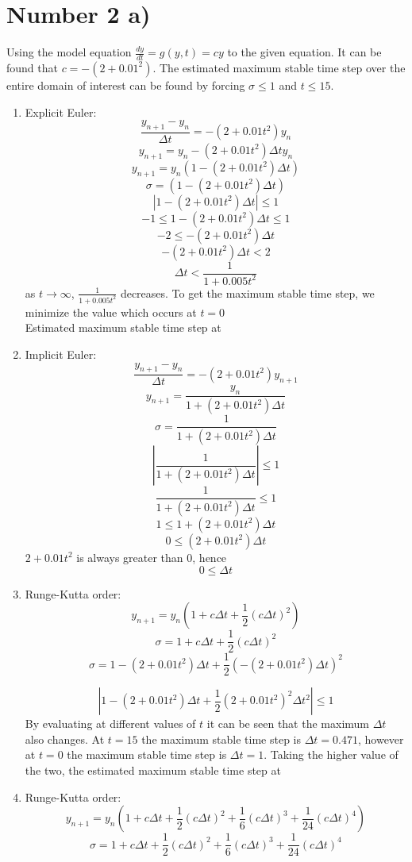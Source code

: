 \documentclass{article}
\begin{document}
	\section*{Number 2 a)}
		Using the model equation $\frac{dy}{dt} = g(y,t) = cy$ to the given equation. It can be found that $c=-(2+0.01^2)$. The estimated maximum stable time step over the entire domain of interest can be found by forcing $\sigma \leq 1$ and $t \leq 15 $.
		\begin{enumerate}[label=(\alph*)]
			\item Explicit Euler: 
			$$\frac{y_{n+1}-y_n}{\Delta t} = -(2+0.01t^2)y_n $$
			$$y_{n+1} = y_{n} -(2+0.01t^2)\Delta t y_{n}$$
			$$y_{n+1} = y_{n}(1 -(2+0.01t^2)\Delta t)$$
			$$\sigma = (1-(2+0.01t^2)\Delta t)$$
			$$|1-(2+0.01t^2)\Delta t| \leq 1$$
			$$-1 \leq 1-(2+0.01t^2)\Delta t \leq 1$$
			$$-2 \leq -(2+0.01t^2)\Delta t $$
			$$ -(2+0.01t^2)\Delta t < 2  $$
			$$ \Delta t < \frac{1}{1+0.005t^2}$$
			as $t \rightarrow \infty$, $\frac{1}{1+0.005t^2}$ decreases. To get the maximum stable time step, we minimize the value which occurs at $t = 0$ \\
			Estimated maximum stable time step at   			
			\item Implicit Euler:
			$$\frac{y_{n+1}-y_n}{\Delta t} = -(2+0.01t^2)y_{n+1} $$
			$$y_{n+1} = \frac{y_n}{1+(2+0.01t^2)\Delta t}$$
			$$\sigma = \frac{1}{1+(2+0.01t^2)\Delta t}$$
			$$| \frac{1}{1+(2+0.01t^2)\Delta t} |\leq 1 $$
			$$ \frac{1}{1+(2+0.01t^2)\Delta t} \leq 1 $$
			$$ 1 \leq 1 + (2+0.01t^2)\Delta t $$
			$$ 0 \leq (2+0.01t^2)\Delta t $$
			$2+0.01 t^2$ is always greater than 0, hence
			$$ 0 \leq \Delta t $$
			\item Runge-Kutta  order:
				$$y_{n+1} = y_{n} (1+c\Delta t + \frac{1}{2} (c\Delta t)^2) $$
				$$\sigma = 1+c\Delta t + \frac{1}{2} (c\Delta t)^2  $$
				$$\sigma = 1-(2+0.01t^2)\Delta t + \frac{1}{2} (-(2+0.01t^2)\Delta t)^2 $$
				
				$$| 1-(2+0.01t^2)\Delta t + \frac{1}{2}(2+0.01t^2)^2\Delta t^2 | \leq 1 $$
				By evaluating at different values of $t$ it can be seen that the maximum $\Delta t$ also changes. At $t=15$ the maximum stable time step is $\Delta t=0.471$, however at $t=0$ the maximum stable time step is $\Delta t=1$. Taking the higher value of the two, the estimated maximum stable time step at  
			\item Runge-Kutta  order:
				$$y_{n+1} = y_{n} (1+c\Delta t + \frac{1}{2} (c\Delta t)^2 + \frac{1}{6} (c\Delta t)^3 + \frac{1}{24} (c\Delta t)^4) $$
				$$\sigma = 1+c\Delta t + \frac{1}{2} (c\Delta t)^2 + \frac{1}{6} (c\Delta t)^3 + \frac{1}{24} (c\Delta t)^4  $$
				

\end{enumerate}
\end{document}
